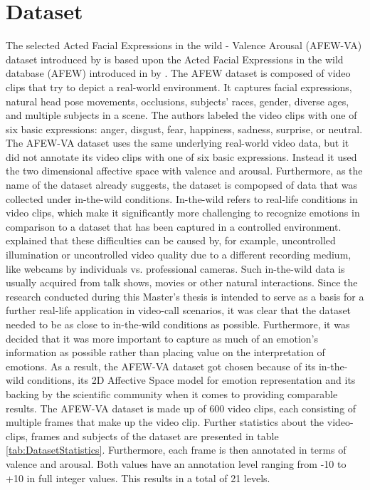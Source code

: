 \section{Dataset}
The selected Acted Facial Expressions in the wild - Valence Arousal (AFEW-VA) dataset introduced by \citet{Kossaifi:2017:AFEW-VADatabase} is based upon the Acted Facial Expressions in the wild database (AFEW) introduced in \citeyear{Dhall:2012:AFEW} by \citet{Dhall:2012:AFEW}. The AFEW dataset is composed of video clips that try to depict a real-world environment. It captures facial expressions, natural head pose movements, occlusions, subjects' races, gender, diverse ages, and multiple subjects in a scene. The authors labeled the video clips with one of six basic expressions: anger, disgust, fear, happiness, sadness, surprise, or neutral. The AFEW-VA dataset \citep{Kossaifi:2017:AFEW-VADatabase} uses the same underlying real-world video data, but it did not annotate its video clips with one of six basic expressions. Instead it used the two dimensional affective space with valence and arousal. 
\newline\newline
Furthermore, as the name of the dataset already suggests, the dataset is compopsed of data that was collected under in-the-wild conditions. In-the-wild refers to real-life conditions in video clips, which make it significantly more challenging to recognize emotions in comparison to a dataset that has been captured in a controlled environment. \citet{Salah:2018:VideoBasedER} explained that these difficulties can be caused by, for example, uncontrolled illumination or uncontrolled video quality due to a different recording medium, like webcams by individuals vs. professional cameras. Such in-the-wild data is usually acquired from talk shows, movies or other natural interactions. 
\newline\newline
Since the research conducted during this Master's thesis is intended to serve as a basis for a further real-life application in video-call scenarios, it was clear that the dataset needed to be as close to in-the-wild conditions as possible. Furthermore, it was decided that it was more important to capture as much of an emotion's information as possible rather than placing value on the interpretation of emotions. As a result, the AFEW-VA dataset got chosen because of its in-the-wild conditions, its 2D Affective Space model for emotion representation and its backing by the scientific community when it comes to providing comparable results.
\newline\newline
The AFEW-VA dataset is made up of 600 video clips, each consisting of multiple frames that make up the video clip. Further statistics about the video-clips, frames and subjects of the dataset are presented in table \ref{tab:DatasetStatistics}. Furthermore, each frame is then annotated in terms of valence and arousal. Both values have an annotation level ranging from -10 to +10 in full integer values. This results in a total of 21 levels.\citep{Kossaifi:2017:AFEW-VADatabase} 

